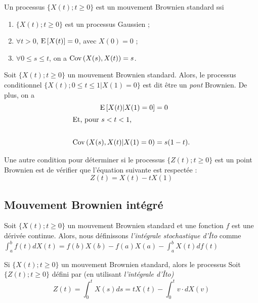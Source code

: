 \documentclass[10pt, french, landscape]{article}
\begin{document}
\begin{multicols*}{2}
\begin{definition}
Un processus $\{X(t) ; t \geq 0 \}$ est un mouvement Brownien standard ssi
\begin{enumerate}[label=(\arabic*)]
\item $\{X(t) ; t \geq 0 \}$ est un processus Gaussien ;
\item $\forall t > 0$, $\mathrm{E} \left[ X(t) \right] = 0$, avec $X(0) = 0$ ;
\item $\forall 0 \leq s \leq t$, on a $\mathrm{Cov} \left( X(s), X(t) \right) = s$.
\end{enumerate}
\end{definition}

\begin{definition}
Soit $\{X(t) ; t \geq 0 \}$ un mouvement Brownien standard. Alors, le processus conditionnel $\{X(t) ; 0 \leq t \leq 1 | X(1) = 0 \}$ est dit être un \emph{pont} Brownien.  De plus, on a
\begin{align*}
\mathrm{E} \left[ X(t) | X(1) = 0 \right] & = 0 \\
\shortintertext{Et, pour $s < t < 1$,} \\
\mathrm{Cov} \left( X(s), X(t) | X(1) = 0 \right) & = s(1-t). \\
\end{align*}
\end{definition}
Une autre condition pour déterminer si le processus $\{ Z(t) ; t \geq 0 \}$ est un point Brownien est de vérifier que l'équation suivante est respectée : 
\[Z(t) = X(t) - t X(1) \]

\subsection*{Mouvement Brownien intégré}
\begin{definition}
Soit $\{X(t) ; t \geq 0 \}$ un mouvement Brownien standard et une fonction $f$ est une dérivée continue. Alors, nous définissons \emph{l'intégrale stochastique d'Îto} comme \\
$\int_{a}^{b} f(t) d X(t) = f(b) X(b) - f(a) X(a) - \int_{a}^{b} X(t) d f(t)$
\end{definition}

\begin{definition}
Si $\{X(t) ; t \geq 0 \}$ un mouvement Brownien standard, alors le processus Soit $\{Z(t) ; t \geq 0 \}$ défini par (en utilisant \emph{l'intégrale d'Îto)}
\[Z(t) = \int_{0}^{t} X(s) ds = t X(t) - \int_{0}^{t} v \cdot  d X(v) \]
\end{definition}



\end{multicols*}
\end{document}
